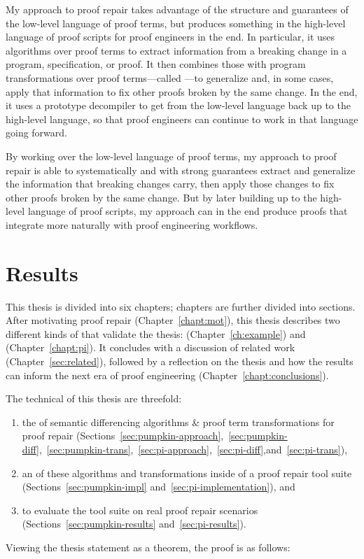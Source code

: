 My approach to proof repair takes advantage of the structure and guarantees of the low-level language of proof terms,
but produces something in the high-level language of proof scripts for proof engineers in the end.
In particular, it uses  algorithms over proof terms
to extract information from a breaking change in a program, specification, or proof.
It then combines those with program transformations over proof terms---called ---to
generalize and, in some cases, apply that information to fix other  proofs broken by the same change.
In the end, it uses a prototype decompiler to get from the low-level language back up to the high-level language,
so that proof engineers can continue to work in that language going forward. %

By working over the low-level language of proof terms,
my approach to proof repair is able to systematically and with strong guarantees extract and generalize the information that breaking changes carry,
then apply those changes to fix other proofs broken by the same change.
But by later building up to the high-level language of proof scripts,
my approach can in the end produce proofs that integrate more naturally with proof engineering workflows.

\section{Results}
\label{sec:intro-results}

This thesis is divided into six chapters; chapters are further divided into sections.
After motivating proof repair (Chapter~\ref{chapt:mot}),
this thesis describes two different kinds of  that validate the thesis:
 (Chapter~\ref{ch:example}) and  (Chapter~\ref{chapt:pi}).
It concludes with a discussion of related work (Chapter~\ref{sec:related}),
followed by a reflection on the thesis and how the results can inform the next era of 
proof engineering (Chapter~\ref{chapt:conclusions}).

The technical  of this thesis are threefold:

\begin{enumerate}
\item the  of semantic differencing algorithms \& proof term transformations for proof repair (Sections~\ref{sec:pumpkin-approach},~\ref{sec:pumpkin-diff},~\ref{sec:pumpkin-trans},~\ref{sec:pi-approach},~\ref{sec:pi-diff},and~\ref{sec:pi-trans}),
\item an  of these algorithms and transformations inside of a proof repair tool suite (Sections~\ref{sec:pumpkin-impl} and~\ref{sec:pi-implementation}), and
\item {} to evaluate the tool suite on real proof repair scenarios (Sections~\ref{sec:pumpkin-results} and~\ref{sec:pi-results}).
\end{enumerate}
Viewing the thesis statement as a theorem, the proof is as follows: %

